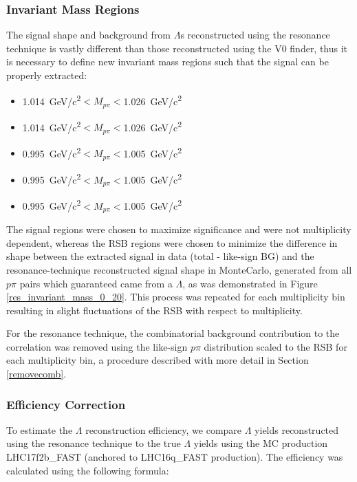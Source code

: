 \documentclass[ALICE,manyauthors]{ALICE_analysis_notes}
\begin{document}
\subsubsection{Invariant Mass Regions}

The signal shape and background from $\Lambda$s reconstructed using the resonance technique is vastly different than those reconstructed using the V0 finder, thus it is necessary to define new invariant mass regions such that the signal can be properly extracted:

\begin{itemize}
	\item {}  \SI{1.014}{GeV/c^2}$< M_{p\pi} < $\SI{1.026}{GeV/c^2}
	\item {}  \SI{1.014}{GeV/c^2}$< M_{p\pi} < $\SI{1.026}{GeV/c^2}
	\item  {}  \SI{0.995}{GeV/c^2}$< M_{p\pi} < $\SI{1.005}{GeV/c^2}
	\item  {}  \SI{0.995}{GeV/c^2}$< M_{p\pi} < $\SI{1.005}{GeV/c^2}
	\item  {}  \SI{0.995}{GeV/c^2}$< M_{p\pi} < $\SI{1.005}{GeV/c^2}
\end{itemize}

The signal regions were chosen to maximize significance and were not multiplicity dependent, whereas the RSB regions were chosen to minimize the difference in shape between the extracted signal in data (total - like-sign BG) and the resonance-technique reconstructed signal shape in MonteCarlo, generated from all $p\pi$ pairs which guaranteed came from a $\Lambda$, as was demonstrated in Figure \ref{res_invariant_mass_0_20}. This process was repeated for each multiplicity bin resulting in slight fluctuations of the RSB with respect to multiplicity.



For the resonance technique, the combinatorial background contribution to the correlation was removed using the like-sign $p\pi$ distribution scaled to the RSB for each multiplicity bin, a procedure described with more detail in Section \ref{removecomb}.

\subsubsection{Efficiency Correction}
To estimate the $\Lambda$ reconstruction efficiency, we compare $\Lambda$ yields reconstructed using the resonance technique to the true $\Lambda$ yields using the MC production LHC17f2b\_FAST (anchored to LHC16q\_FAST production). The efficiency was calculated using the following formula:
\end{document}
